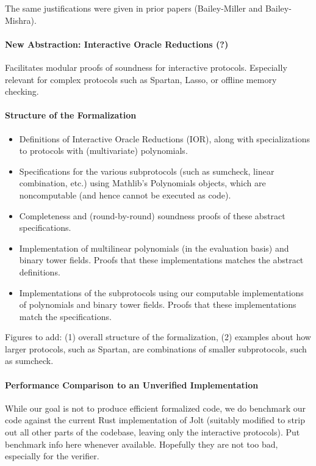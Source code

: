 The same justifications were given in prior papers (Bailey-Miller and Bailey-Mishra).


\paragraph{New Abstraction: Interactive Oracle Reductions (?)}


Facilitates modular proofs of soundness for interactive protocols. Especially relevant for complex protocols such as Spartan, Lasso, or offline memory checking.



\paragraph{Structure of the Formalization}

\begin{itemize}
    \item Definitions of Interactive Oracle Reductions (IOR), along with specializations to protocols with (multivariate) polynomials.
    \item Specifications for the various subprotocols (such as sumcheck, linear combination, etc.) using Mathlib's Polynomials objects, which are noncomputable (and hence cannot be executed as code).
    \item Completeness and (round-by-round) soundness proofs of these abstract specifications.
    \item Implementation of multilinear polynomials (in the evaluation basis) and binary tower fields. Proofs that these implementations matches the abstract definitions.
    \item Implementations of the subprotocols using our computable implementations of polynomials and binary tower fields. Proofs that these implementations match the specifications.
\end{itemize}

{\color{red} Figures to add: (1) overall structure of the formalization, (2) examples about how larger protocols, such as Spartan, are combinations of smaller subprotocols, such as sumcheck.}



\paragraph{Performance Comparison to an Unverified Implementation} While our goal is not to produce efficient formalized code, we do benchmark our code against the current Rust implementation of Jolt (suitably modified to strip out all other parts of the codebase, leaving only the interactive protocols). {\color{red} Put benchmark info here whenever available. Hopefully they are not too bad, especially for the verifier.}

